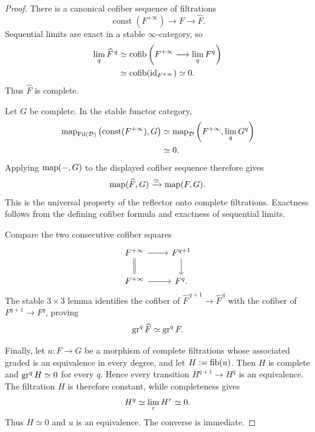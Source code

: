 \begin{proof}
There is a canonical cofiber sequence of filtrations
\[
    \operatorname{const}(F^{+\infty})
    \longrightarrow
    F
    \longrightarrow
    \widehat F.
\]
Sequential limits are exact in a stable \(\infty\)-category, so
\[
\begin{aligned}
    \operatorname*{lim}_q\widehat F^{\,q}
    &\simeq
    \operatorname{cofib}
    \left(
        F^{+\infty}
        \longrightarrow
        \operatorname*{lim}_qF^q
    \right)
    \\
    &\simeq
    \operatorname{cofib}(\operatorname{id}_{F^{+\infty}})
    \simeq0.
\end{aligned}
\]
Thus \(\widehat F\) is complete.

Let \(G\) be complete.  In the stable functor category,
\[
\begin{aligned}
    \operatorname{map}_{\operatorname{Fil}(\mathcal D)}
    \left(
        \operatorname{const}(F^{+\infty}),G
    \right)
    &\simeq
    \operatorname{map}_{\mathcal D}
    \left(
        F^{+\infty},
        \operatorname*{lim}_qG^q
    \right)
    \\
    &\simeq0.
\end{aligned}
\]
Applying \(\operatorname{map}(-,G)\) to the displayed cofiber sequence therefore gives
\[
    \operatorname{map}(\widehat F,G)
    \xrightarrow{\simeq}
    \operatorname{map}(F,G).
\]
This is the universal property of the reflector onto complete filtrations.
Exactness follows from the defining cofiber formula and exactness of sequential
limits.

Compare the two consecutive cofiber squares
\[
\begin{tikzcd}
    F^{+\infty} \ar[r] \ar[d,equal]
        & F^{q+1} \ar[d]\\
    F^{+\infty} \ar[r]
        & F^q.
\end{tikzcd}
\]
The stable \(3\times3\) lemma identifies the cofiber of
\(\widehat F^{\,q+1}\to\widehat F^{\,q}\) with the cofiber of
\(F^{q+1}\to F^q\), proving
\[
    \operatorname{gr}^q\widehat F\simeq\operatorname{gr}^qF.
\]

Finally, let \(u:F\to G\) be a morphism of complete filtrations whose associated
graded is an equivalence in every degree, and let \(H:=\operatorname{fib}(u)\).  Then \(H\)
is complete and \(\operatorname{gr}^qH\simeq0\) for every \(q\).  Hence every transition
\(H^{q+1}\to H^q\) is an equivalence.  The filtration \(H\) is therefore
constant, while completeness gives
\[
    H^q\simeq\operatorname*{lim}_rH^r\simeq0.
\]
Thus \(H\simeq0\) and \(u\) is an equivalence.  The converse is immediate.
\end{proof}

